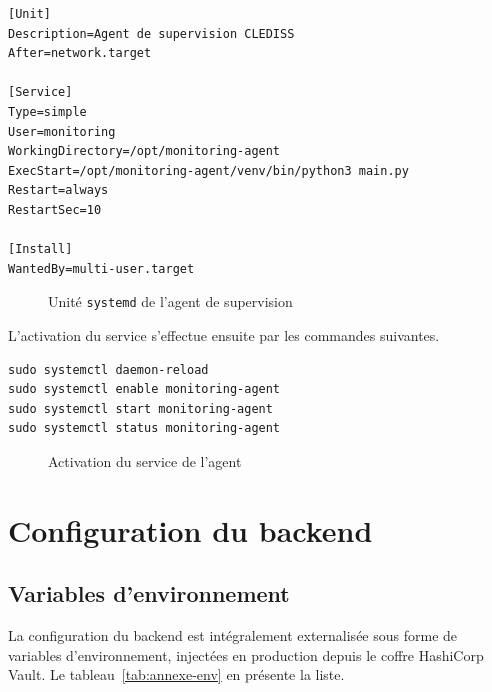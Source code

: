 \begin{lrbox}{\annexbox}
\begin{minipage}{0.88\textwidth}
\begin{verbatim}
[Unit]
Description=Agent de supervision CLEDISS
After=network.target

[Service]
Type=simple
User=monitoring
WorkingDirectory=/opt/monitoring-agent
ExecStart=/opt/monitoring-agent/venv/bin/python3 main.py
Restart=always
RestartSec=10

[Install]
WantedBy=multi-user.target
\end{verbatim}
\end{minipage}
\end{lrbox}
\begin{figure}[H]
\centering
\fbox{\usebox{\annexbox}}
\caption{Unité \texttt{systemd} de l'agent de supervision}
\label{fig:annexe-systemd}
\end{figure}

L'activation du service s'effectue ensuite par les commandes suivantes.

\begin{lrbox}{\annexbox}
\begin{minipage}{0.88\textwidth}
\begin{verbatim}
sudo systemctl daemon-reload
sudo systemctl enable monitoring-agent
sudo systemctl start monitoring-agent
sudo systemctl status monitoring-agent
\end{verbatim}
\end{minipage}
\end{lrbox}
\begin{figure}[H]
\centering
\fbox{\usebox{\annexbox}}
\caption{Activation du service de l'agent}
\label{fig:annexe-activation}
\end{figure}

\chapter{Configuration du backend}

\section{Variables d'environnement}
La configuration du backend est intégralement externalisée sous forme de variables
d'environnement, injectées en production depuis le coffre HashiCorp Vault. Le
tableau~\ref{tab:annexe-env} en présente la liste.

